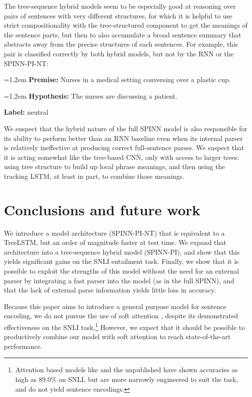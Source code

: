 \documentclass[11pt]{article}
\newcommand{\snli}[3]{{\vspace{0.25em}
{\small \setlength{\parindent}{0.6em} \hangindent=1.2em  \textbf{Premise:} #1\par}\vspace{0.25em}
{\small \setlength{\parindent}{0.6em} \hangindent=1.2em   \textbf{Hypothesis:} #2\par}\vspace{0.25em}
{\small \setlength{\parindent}{0.6em}  \textbf{Label:} #3\par}
}}
\begin{document}
The tree-sequence hybrid models seem to be especially good at reasoning over pairs of sentences with very different structures, for which it is helpful to use strict compositionality with the tree-structured component to get the meanings of the sentence parts, but then to also accumulate a broad sentence summary that abstracts away from the precise structures of each sentences. For example, this pair is classified correctly by both hybrid models, but not by the RNN or the SPINN-PI-NT:

\snli{Nurses in a medical setting conversing over a plastic cup.}
{The nurses are discussing a patient.}
{neutral}

We suspect that the hybrid nature of the full SPINN model is also responsible for its ability to perform better than an RNN baseline even when its internal parser is relatively ineffective at producing correct full-sentence parses. We suspect that it is acting somewhat like the tree-based CNN, only with access to larger trees: using tree structure to build up local phrase meanings, and then using the tracking LSTM, at least in part, to combine those meanings.

\section{Conclusions and future work}

We introduce a model architecture (SPINN-PI-NT) that is equivalent to a TreeLSTM, but an order of magnitude faster at test time. We expand that architecture into a tree-sequence hybrid model (SPINN-PI), and show that this yields significant gains on the SNLI entailment task. Finally, we show that it is possible to exploit the strengths of this model without the need for an external parser by integrating a fast parser into the model (as in the full SPINN), and that the lack of external parse information yields little loss in accuracy.

Because this paper aims to introduce a general purpose model for sentence encoding, we do not pursue the use of soft attention \citep{bahdanau2014neural,rocktaschel2015reasoning}, despite its demonstrated effectiveness on the SNLI task.\footnote{Attention based models like \citet{rocktaschel2015reasoning} and the unpublished \citet{cheng2016long} have shown accuracies as high as 89.0\% on SNLI, but are more narrowly engineered to suit the task, and do not yield sentence encodings.} However, we expect that it should be possible to productively combine our model with soft attention to reach state-of-the-art performance.
\end{document}
